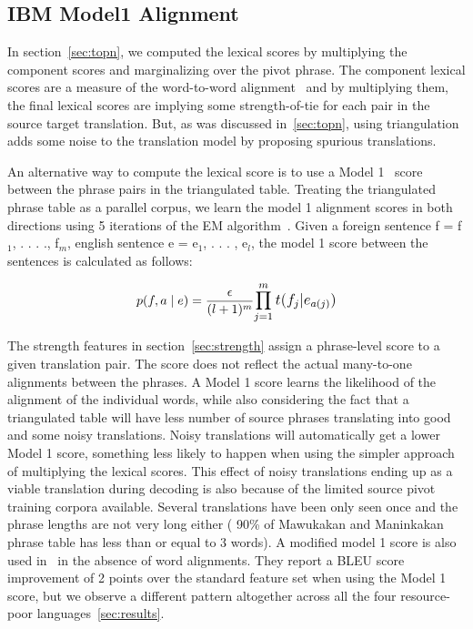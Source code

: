 \subsection{IBM Model1 Alignment}
\label{subsec:model1}

        In section~\ref{sec:topn}, we computed the lexical scores by multiplying the component scores and marginalizing over the pivot phrase. The component lexical scores are a measure of the word-to-word alignment~\cite{Koehn:03} and by multiplying them, the final lexical scores are implying some strength-of-tie for each pair in the source target translation. But, as was discussed in~\ref{sec:topn}, using triangulation adds some noise to the translation model by proposing spurious translations.

        An alternative way to compute the lexical score is to use a Model 1~\cite{Brown:1993} score between the phrase pairs in the triangulated table. Treating the triangulated phrase table as a parallel corpus, we learn the model 1 alignment scores in both directions using 5 iterations of the EM algorithm~\cite{Dempster:77}. Given a foreign sentence f = f$_{1}$, . . . ., f$_{m}$, english sentence e = e$_{1}$, . . . , e$_{l}$, the model 1 score between the sentences is calculated as follows:

                \begin{equation}
                        p(f, a \mid e) = \frac{\epsilon}{(l+1)^m}\mathlarger{\prod\limits_{j=1}^{m}t(f_{j}|e_{a(j)})}
                \end{equation}

        The strength features in section~\ref{sec:strength} assign a phrase-level score to a given translation pair. The score does not reflect the actual many-to-one alignments between the phrases. A Model 1 score learns the likelihood of the alignment of the individual words, while also considering the fact that a triangulated table will have less number of source phrases translating into good and some noisy translations. Noisy translations will automatically get a lower Model 1 score, something less likely to happen when using the simpler approach of multiplying the lexical scores. This effect of noisy translations ending up as a viable translation during decoding is also because of the limited source pivot training corpora available. Several translations have been only seen once and the phrase lengths are not very long either ( 90\% of Mawukakan and Maninkakan phrase table has less than or equal to 3 words). A modified model 1 score is also used in~\cite{Cohn:07} in the absence of word alignments. They report a BLEU score improvement of 2 points over the standard feature set when using the Model 1 score, but we observe a different pattern altogether across all the four resource-poor languages~\ref{sec:results}.

